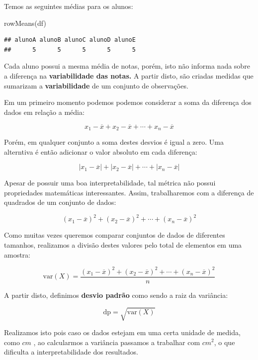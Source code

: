 \documentclass[
]{book}
\newenvironment{Shaded}{\begin{snugshade}}{\end{snugshade}}
\newcommand{\FunctionTok}[1]{\textcolor[rgb]{0.00,0.00,0.00}{#1}}
\newcommand{\NormalTok}[1]{#1}
\begin{document}
Temos as seguintes médias para os alunos:

\begin{Shaded}
\begin{Highlighting}[]
\FunctionTok{rowMeans}\NormalTok{(df)}
\end{Highlighting}
\end{Shaded}

\begin{verbatim}
## alunoA alunoB alunoC alunoD alunoE 
##      5      5      5      5      5
\end{verbatim}

Cada aluno possui a mesma média de notas, porém, isto não informa nada sobre a diferença na \textbf{variabilidade das notas.} A partir disto, são criadas medidas que sumarizam a \textbf{variabilidade} de um conjunto de observações.

Em um primeiro momento podemos podemos considerar a soma da diferença dos dados em relação a média:

\[
x_1 - \overline{x} + x_2 - \overline{x} + \cdots + x_n - \overline{x}
\]

Porém, em qualquer conjunto a soma destes desvios é igual a zero. Uma alterntiva é então adicionar o valor absoluto em cada diferença:

\[
|x_1 - \overline{x}| + |x_2 - \overline{x}| + \cdots + |x_n - \overline{x}|
\]

Apesar de possuir uma boa interpretabilidade, tal métrica não possui propriedades matemáticas interessantes. Assim, trabalharemos com a diferença de quadrados de um conjunto de dados:

\[
(x_1 - \overline{x})^2 + (x_2 - \overline{x})^2 + \cdots + (x_n - \overline{x})^2
\]

Como muitas vezes queremos comparar conjuntos de dados de diferentes tamanhos, realizamos a divisão destes valores pelo total de elementos em uma amostra:

\[
\text{var}(X) = \frac{(x_1 - \overline{x})^2 + (x_2 - \overline{x})^2 + \cdots + (x_n - \overline{x})^2}{n}
\]

A partir disto, definimos \textbf{desvio padrão} como sendo a raiz da variância:

\[
\text{dp} = \sqrt{\text{var}(X)}
\]

Realizamos isto pois caso os dados estejam em uma certa unidade de medida, como \(cm\) , ao calcularmos a variância passamos a trabalhar com \(cm^2\), o que dificulta a interpretabilidade dos resultados.
\end{document}
